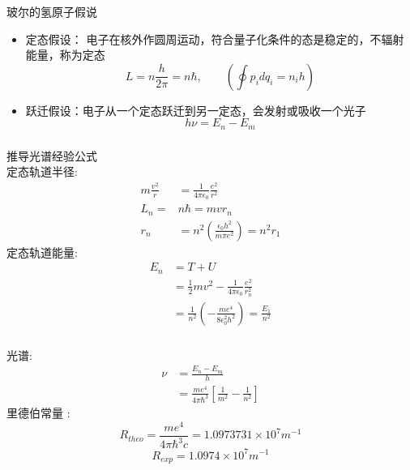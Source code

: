 \begin{frame}   \frametitle{}
    \begin{atcbox}{玻尔的氢原子假说}
        \begin{itemize}
            \item 定态假设： 电子在核外作圆周运动，符合量子化条件的态是稳定的，不辐射能量，称为定态 
            \[ L=n \frac{h}{2\pi}= n \hbar,\qquad (\oint p_i dq_i = n_i h)\] 
            \item 跃迁假设：电子从一个定态跃迁到另一定态，会发射或吸收一个光子
            \[ h\nu=E_n -E_m \]
        \end{itemize}
    \end{atcbox}
\end{frame}

\begin{frame}   
    \frametitle{}
    推导光谱经验公式\\
    {\Bullet} 定态轨道半径:
    \begin{equation*}
        \begin{split}
            m\frac{v^2}{r}&=\frac{1}{4\pi\epsilon_0} \frac{e^2}{r^2} \\
            L_n=&n\hbar=mvr_n  \\
            r_n&= n^2 (\frac{\epsilon_0 h^2}{m\pi e^2}) =n^2 r_1   
        \end{split} 
     \end{equation*}
     {\Bullet} 定态轨道能量: 
     \begin{equation*}
        \begin{split}
            E_n &= T + U \\
            &= \frac{1}{2}mv^2- \frac{1}{4\pi\epsilon_0} \frac{e^2}{r_n ^2} \\
            &= \frac{1}{n^2} (-\frac{m e^4}{8 \epsilon_0 ^2 h^2}) = \frac{E_1}{n^2}
        \end{split}  
     \end{equation*}
\end{frame}

\begin{frame} \frametitle{}
    {\Bullet} 光谱: 
    \begin{equation*}
        \begin{split}
         \nu&=\frac{E_n -E_m}{h} \\
         &= \frac{m e^4}{4\pi \hbar ^3} [\frac{1}{m^2} -\frac{1}{n^2}]
        \end{split}  
     \end{equation*}
     {\Bullet} 里德伯常量 : 
     \[R_{theo}= \frac{m e^4}{4\pi \hbar ^3 c} =1.0973731\times 10^7 m^{-1}\]
    \[R_{exp}=1.0974\times10^7 m^{-1} \]  
\end{frame}

